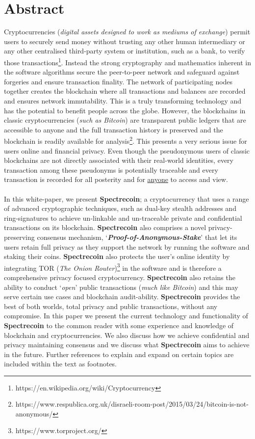 \section{Abstract}
Cryptocurrencies (\textit{digital assets designed to work as mediums of exchange})
permit users to securely send money without trusting any other human intermediary
or any other centralised third-party system or institution, such as a bank, to
verify those transactions\footnote{https://en.wikipedia.org/wiki/Cryptocurrency}.
Instead the strong cryptography and mathematics inherent in the software
algorithms secure the peer-to-peer network and safeguard against forgeries and
ensure transaction finality. The network of participating nodes together
creates the blockchain where all transactions and balances are recorded and
ensures network immutability. This is a truly transforming technology and has
the potential to benefit people across the globe. However, the blockchains in
classic cryptocurrencies (\textit{such as Bitcoin}) are transparent public
ledgers that are accessible to anyone and the full transaction history is
preserved and the blockchain is readily available for analysis\footnote{https://www.respublica.org.uk/disraeli-room-post/2015/03/24/bitcoin-is-not-anonymous/}. 
This presents a very serious issue for users online and financial privacy.
Even though the pseudonymous users of classic blockchains are not directly
associated with their real-world identities, every transaction among these
pseudonyms is potentially traceable and every transaction is recorded for
all posterity and for \underline{anyone} to access and view.
\\
\\
In this white-paper, we present \textbf{Spectrecoin}; a cryptocurrency that
uses a range of advanced cryptographic techniques, such as dual-key stealth
addresses and ring-signatures to achieve un-linkable and un-traceable
private and confidential transactions on its blockchain. \textbf{Spectrecoin}
also comprises a novel privacy-preserving consensus mechanism,
‘\textbf{\textit{Proof-of-Anonymous-Stake}}’ that let its users retain
full privacy as they support the network by running the software and
staking their coins. \textbf{Spectrecoin} also protects the user’s online
identity by integrating TOR (\textit{The Onion Router})\footnote{https://www.torproject.org/} 
in the software and is therefore a
comprehensive privacy focused cryptocurrency. \textbf{Spectrecoin} also
retains the ability to conduct ‘\textit{open}’ public transactions
(\textit{much like Bitcoin}) and this may serve certain use cases and
blockchain audit-ability. \textbf{Spectrecoin} provides the best of both
worlds, total privacy and public transactions, without any compromise.
In this paper we present the current technology and functionality of
\textbf{Spectrecoin} to the common reader with some experience and knowledge
of blockchain and cryptocurrencies. We also discuss how we achieve
confidential and privacy maintaining consensus and we discuss what
\textbf{Spectrecoin} aims to achieve in the future. Further references
to explain and expand on certain topics are included within the text as
footnotes.

